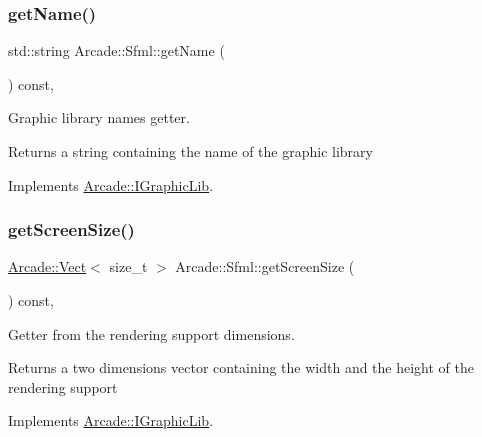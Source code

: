 \subsubsection{\texorpdfstring{get\+Name()}{getName()}}
{\footnotesize\ttfamily std\+::string Arcade\+::\+Sfml\+::get\+Name (\begin{DoxyParamCaption}{ }\end{DoxyParamCaption}) const\hspace{0.3cm}{\ttfamily [final]}, {\ttfamily [virtual]}}



Graphic library name\textquotesingle{}s getter. 

\begin{DoxyReturn}{Returns}
a string containing the name of the graphic library 
\end{DoxyReturn}


Implements \hyperlink{class_arcade_1_1_i_graphic_lib_aecc266c4ac10f07f4cdca023e74e843d}{Arcade\+::\+I\+Graphic\+Lib}.

\mbox{\label{class_arcade_1_1_sfml_aa2fe7257182649ba0273712d36296460}} 
\subsubsection{\texorpdfstring{get\+Screen\+Size()}{getScreenSize()}}
{\footnotesize\ttfamily \hyperlink{class_arcade_1_1_vect}{Arcade\+::\+Vect}$<$ size\+\_\+t $>$ Arcade\+::\+Sfml\+::get\+Screen\+Size (\begin{DoxyParamCaption}{ }\end{DoxyParamCaption}) const\hspace{0.3cm}{\ttfamily [final]}, {\ttfamily [virtual]}}



Getter from the rendering support dimensions. 

\begin{DoxyReturn}{Returns}
a two dimensions vector containing the width and the height of the rendering support 
\end{DoxyReturn}


Implements \hyperlink{class_arcade_1_1_i_graphic_lib_a0ce5eb4661d55b6e729fc1c16566dd9f}{Arcade\+::\+I\+Graphic\+Lib}.

\mbox{\label{class_arcade_1_1_sfml_a427b6fc608c3b52f167b1fe79f5a5009}} 
